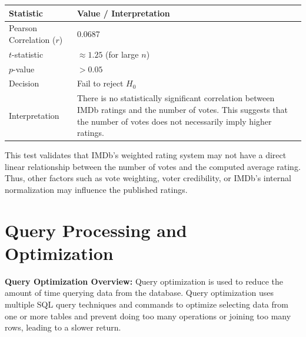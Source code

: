 \begin{center}
	\begin{tabular}{|p{2cm}|p{4cm}|}
		\hline
		\textbf{Statistic} & \textbf{Value / Interpretation} \\
		\hline
		Pearson Correlation ($r$) & 0.0687 \\
		\hline
		$t$-statistic & $\approx 1.25$ (for large $n$) \\
		\hline
		$p$-value & $> 0.05$ \\
		\hline
		Decision & Fail to reject $H_0$ \\
		\hline
		Interpretation & There is no statistically significant correlation between IMDb ratings and the number of votes. This suggests that the number of votes does not necessarily imply higher ratings. \\
		\hline
	\end{tabular}
\end{center}

This test validates that IMDb’s weighted rating system may not have a direct linear relationship between the number of votes and the computed average rating. Thus, other factors such as vote weighting, voter credibility, or IMDb’s internal normalization may influence the published ratings.


\section{Query Processing and Optimization}

\textbf{Query Optimization Overview:}  
Query optimization is used to reduce the amount of time querying data from the database. Query optimization uses multiple SQL query techniques and commands to optimize selecting data from one or more tables and prevent doing too many operations or joining too many rows, leading to a slower return. 

